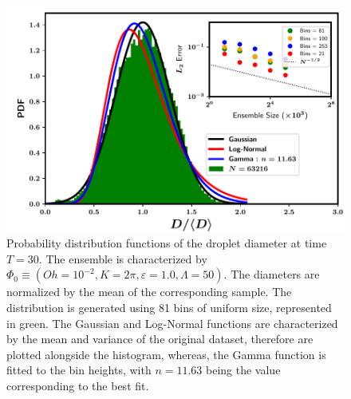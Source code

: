 \begin{figure}
\centering
\includegraphics{plots/drop_stats/long_time_diameter_fits.pdf}
\caption{Probability distribution functions of the droplet diameter at time $T = 30$. 
The ensemble is characterized by $\Phi_0 \equiv \left( Oh = 10^{-2}, K = 2\pi , \varepsilon = 1.0 , \Lambda = 50 \right)$. 
The diameters are normalized by the mean of the corresponding sample.  
The distribution is generated using 81 bins of uniform size, represented in green.  
The Gaussian and Log-Normal functions are characterized by the mean and variance of the original dataset, 
therefore are plotted alongside the histogram, whereas, the Gamma function is fitted to the bin heights,
with $n= 11.63$ being the value corresponding to the best fit.
	}
\label{t2_dia_fits}
\end{figure}

